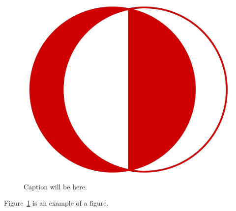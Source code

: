 \begin{figure}[tb]
\centering
\includegraphics[width = 0.4\hsize]{document/figures/odtu_logo.png}
\caption{Caption will be here.}
\label{fig:logo}
\end{figure}

Figure~\ref{fig:logo} is an example of a figure. 
